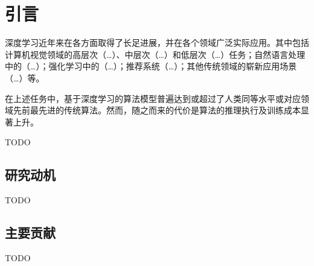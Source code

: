 \chapter{引言} \label{chap:introduction}

深度学习近年来在各方面取得了长足进展，并在各个领域广泛实际应用。其中包括计算机视觉领域的高层次（…）、中层次（…）和低层次（…）任务；自然语言处理中的（…）；强化学习中的（…）；推荐系统（…）；其他传统领域的崭新应用场景（…）等。

在上述任务中，基于深度学习的算法模型普遍达到或超过了人类同等水平或对应领域先前最先进的传统算法。然而，随之而来的代价是算法的推理执行及训练成本显著上升。

TODO

\section{研究动机}
TODO

\section{主要贡献}
TODO